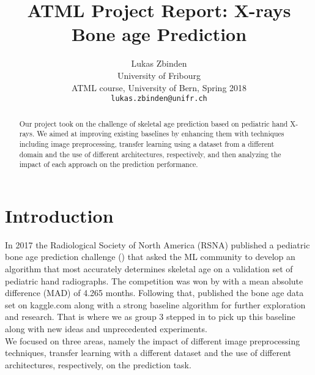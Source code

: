 \documentclass[10pt,twocolumn,letterpaper]{article}
\begin{document}
\title{ATML Project Report: X-rays Bone age Prediction}

\author{Lukas Zbinden\\
University of Fribourg\\
ATML course, University of Bern, Spring 2018\\
{\tt\small lukas.zbinden@unifr.ch}
}

\maketitle

\begin{abstract}
   Our project took on the challenge of skeletal age prediction based on pediatric hand X-rays. We aimed at improving existing baselines by enhancing them with techniques including image preprocessing, transfer learning using a dataset from a different domain and the use of different architectures, respectively, and then analyzing the impact of each approach on the prediction performance.
\end{abstract}

\section{Introduction}
In 2017 the Radiological Society of North America (RSNA) published a pediatric bone age prediction challenge (\cite{rsnacompetition}) that asked the ML community to develop an algorithm that most accurately determines skeletal age on a validation set of pediatric hand radiographs. The competition was won by \cite{16bitrsnachallenge} with a mean absolute difference (MAD) of 4.265 months. Following that, \cite{kaggleboneage} published the bone age data set on kaggle.com along with a strong baseline algorithm for further exploration and research. That is where we as group 3 stepped in to pick up this baseline along with new ideas and unprecedented experiments.\\ We focused on three areas, namely the impact of different image preprocessing techniques, transfer learning with a different dataset and the use of different architectures, respectively, on the prediction task.

\end{document}
